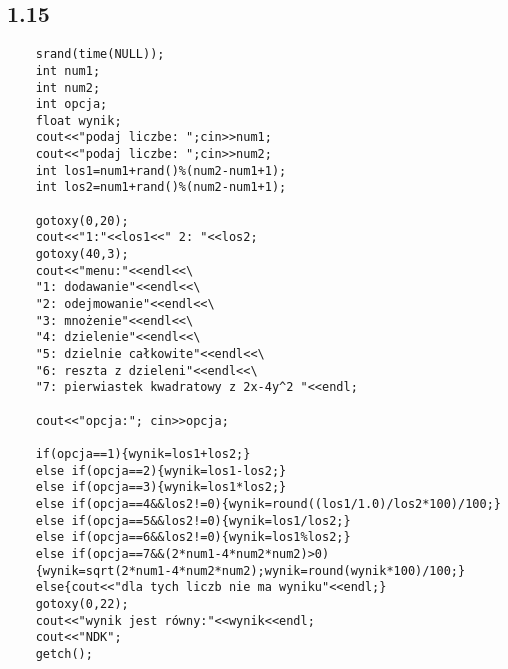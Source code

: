 \documentclass[a4paper,11pt]{article}
\begin{document}
\subsection*{1.15}

\begin{verbatim}
	srand(time(NULL));
	int num1;
	int num2;
	int opcja;
	float wynik;
	cout<<"podaj liczbe: ";cin>>num1;
	cout<<"podaj liczbe: ";cin>>num2;
	int los1=num1+rand()%(num2-num1+1);
	int los2=num1+rand()%(num2-num1+1);
	
	gotoxy(0,20);
	cout<<"1:"<<los1<<" 2: "<<los2;
	gotoxy(40,3);
	cout<<"menu:"<<endl<<\
	"1: dodawanie"<<endl<<\
	"2: odejmowanie"<<endl<<\
	"3: mnożenie"<<endl<<\
	"4: dzielenie"<<endl<<\
	"5: dzielnie całkowite"<<endl<<\
	"6: reszta z dzieleni"<<endl<<\
	"7: pierwiastek kwadratowy z 2x-4y^2 "<<endl;
	
	cout<<"opcja:"; cin>>opcja;
	
	if(opcja==1){wynik=los1+los2;}
	else if(opcja==2){wynik=los1-los2;}
	else if(opcja==3){wynik=los1*los2;}
	else if(opcja==4&&los2!=0){wynik=round((los1/1.0)/los2*100)/100;}
	else if(opcja==5&&los2!=0){wynik=los1/los2;}
	else if(opcja==6&&los2!=0){wynik=los1%los2;}
	else if(opcja==7&&(2*num1-4*num2*num2)>0)
    {wynik=sqrt(2*num1-4*num2*num2);wynik=round(wynik*100)/100;}
	else{cout<<"dla tych liczb nie ma wyniku"<<endl;}
	gotoxy(0,22);
	cout<<"wynik jest równy:"<<wynik<<endl; 
	cout<<"NDK";
	getch();
\end{verbatim}
\pagebreak

\end{document}
